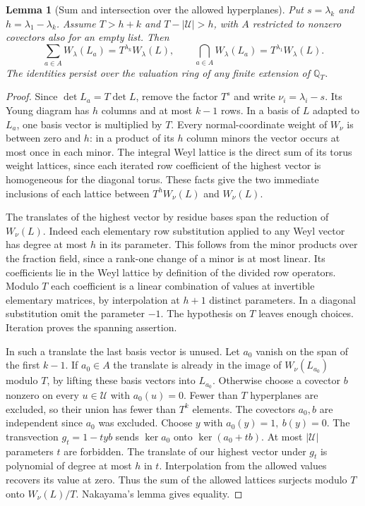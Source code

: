 \documentclass[a4paper,11pt]{article}
\newtheorem{lemma}[proposition]{Lemma}
\theoremstyle{definition}
\theoremstyle{remark}
\numberwithin{equation}{section}
\begin{document}
\begin{lemma}[Sum and intersection over the allowed hyperplanes]\leavevmode
\label{lem:openflags353}
Put \(s=\lambda_k\) and \(h=\lambda_1-\lambda_k\).
Assume \(T>h+k\) and \(T-|\mathcal U|>h\), with \(A\) restricted
to nonzero covectors also for an empty list. Then
\[
  \sum_{a\in A} W_\lambda(L_a)=T^{\lambda_k}W_\lambda(L),
  \qquad
  \bigcap_{a\in A} W_\lambda(L_a)=T^{\lambda_1}W_\lambda(L).
\]
The identities persist over the valuation ring of any finite
extension of \(\mathbb Q_T\).
\end{lemma}
\begin{proof}
Since \(\det L_a=T\det L\), remove the factor \(T^s\) and
write \(\nu_i=\lambda_i-s\). Its Young diagram has \(h\)
columns and at most \(k-1\) rows. In a basis of \(L\) adapted
to \(L_a\), one basis vector is multiplied by \(T\).
Every normal-coordinate weight of \(W_\nu\) is between zero
and \(h\): in a product of its \(h\) column minors the vector
occurs at most once in each minor. The integral Weyl lattice
is the direct sum of its torus weight lattices, since each
iterated row coefficient of the highest vector is homogeneous
for the diagonal torus. These facts give the two immediate
inclusions of each lattice between \(T^hW_\nu(L)\) and \(W_\nu(L)\).

The translates of the highest vector by residue bases span the
reduction of \(W_\nu(L)\). Indeed each elementary row substitution
applied to any Weyl vector has degree at most \(h\) in its
parameter. This follows from the minor products over the fraction
field, since a rank-one change of a minor is at most linear.
Its coefficients lie in the Weyl lattice by definition of the
divided row operators. Modulo \(T\) each coefficient is a linear
combination of values at invertible elementary matrices, by
interpolation at \(h+1\) distinct parameters. In a diagonal
substitution omit the parameter \(-1\). The hypothesis on \(T\)
leaves enough choices. Iteration proves the spanning assertion.

In such a translate the last basis vector is unused. Let \(a_0\)
vanish on the span of the first \(k-1\). If \(a_0\in A\) the
translate is already in the image of \(W_\nu(L_{a_0})\) modulo
\(T\), by lifting these basis vectors into \(L_{a_0}\).
Otherwise choose a covector \(b\) nonzero on every \(u\in\mathcal U\)
with \(a_0(u)=0\). Fewer than \(T\) hyperplanes are excluded,
so their union has fewer than \(T^k\) elements. The covectors
\(a_0,b\) are independent since \(a_0\) was excluded.
Choose \(y\) with \(a_0(y)=1,\ b(y)=0\).
The transvection \(g_t=1-t yb\) sends \(\ker a_0\) onto
\(\ker(a_0+tb)\). At most \(|\mathcal U|\) parameters \(t\)
are forbidden. The translate of our highest vector under \(g_t\)
is polynomial of degree at most \(h\) in \(t\). Interpolation
from the allowed values recovers its value at zero. Thus the
sum of the allowed lattices surjects modulo \(T\) onto \(W_\nu(L)/T\).
Nakayama's lemma gives equality.


\end{proof}
\end{document}
